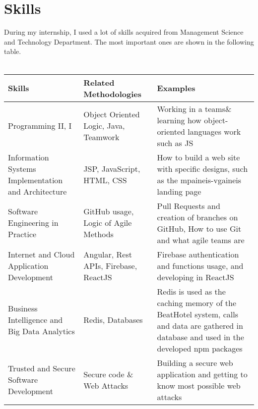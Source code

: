 
\chapter{Skills} %

\label{Chapter6}

During my internship, I used a lot of skills acquired from Management Science and Technology Department. The most important ones are shown in the following table. \\ \\

\begin{center}
	\begin{tabular}{ | p{4cm} | p{5cm} | p{5cm} |}
		\hline
		\textbf{Skills}					
						& \textbf{Related Methodologies} 
										& \textbf{Examples}	\\[0.5cm] \hline
		
		Programming II, I 					
						& Object Oriented Logic, Java, Teamwork
										& Working in a teams\& learning how object-oriented languages work such as JS\\[0.2cm] \hline
		Information Systems Implementation 
		 and Architecture 					
		 				& JSP, JavaScript, HTML, CSS 
		 								& How to build a web site with specific designs, such as the mpaineis-vgaineis landing page \\[0.2cm] \hline
		Software Engineering in Practice 	
						& GitHub usage, Logic of Agile Methods
										& Pull Requests and creation of branches on GitHub,
										How to use Git and what agile teams are  \\[0.2cm] \hline	
		Internet and 
			Cloud Application Development 	
						& Angular, Rest APIs, Firebase, ReactJS
										& Firebase authentication and functions usage, and developing in ReactJS \\[0.2cm] \hline	
		Business Intelligence and 
		 Big Data Analytics 				
		 				& Redis, Databases 
		 								& Redis is used as the caching memory of the BeatHotel system, calls and data are gathered in database and used in the developed npm packages\\[0.2cm] \hline
		Trusted and 
			Secure Software Development		
						& Secure code \& Web Attacks 
										& Building a secure web application and getting to know most possible web attacks \\[0.2cm] \hline
	\end{tabular}
\end{center}

